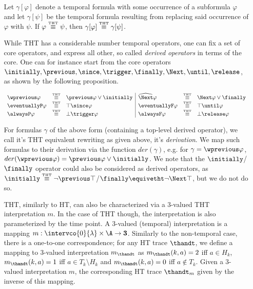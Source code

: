 \begin{proposition}
  Let $\gamma[\varphi]$ denote a temporal formula with some occurrence of a
  subformula $\varphi$ and let $\gamma[\psi]$ be the temporal formula resulting
  from replacing said occurrence of $\varphi$ with $\psi$. If
  $\varphi \stackrel{\normalfont\mbox{\tiny THT}}{\equiv} \psi$, then $\gamma[\varphi] \stackrel{\normalfont\mbox{\tiny THT}}{\equiv} \gamma[\psi]$.
\end{proposition}

While THT has a considerable number temporal operators, one can fix a
set of core operators, and express all other, so called \emph{derived
  operators} in terms of the core. One can for instance start from the
core operators
$\initially, \previous, \since, \trigger, \finally, \Next, \until,
\release$, as shown by the following proposition.

\begin{proposition}\label{prop:derived-op}
\[
\begin{array}{lll|lll}
\wprevious \varphi & \equivtht & \previous \varphi \vee \initially &
\wnext \varphi & \equivtht & \Next \varphi \vee \finally\\
\eventuallyP \varphi & \equivtht & \top \since \varphi &
\eventuallyF \varphi & \equivtht & \top \until \varphi\\
\alwaysP \varphi & \equivtht & \bot \trigger \varphi &
\alwaysF \varphi & \equivtht & \bot \release \varphi\\
\end{array}
\]
\end{proposition}

For formulas $\gamma$ of the above form (containing a top-level
derived operator), we call it's THT equivalent rewriting as given
above, it's \textit{derivation}. We map such formulas to their
derivation via the function $der(\gamma)$, e.g. for
$\gamma = \wprevious \varphi$,
$der(\wprevious \varphi) = \previous \varphi \vee \initially$. We note
that the $\initially$/$\finally$ operator could also be considered as
derived operators, as
$\initially \equivtht \lnot \previous
\top$/$\finally \equivetht \lnot \Next \top$, but we do not do so.

THT, similarly to HT, can also be characterized via a 3-valued THT
interpretation $m$. In the case of THT though, the interpretation is
also parameterized by the time point. A 3-valued (temporal)
interpretation is a mapping
$m: \intervco{0}{\lambda} \times \A \rightarrow \textbf{3}$. Similarly
to the non-temporal case, there is a one-to-one correspondence; for
any HT trace $\thandt$, we define a mapping to 3-valued interpretation
$m_{\thandt}$ as $m_{\thandt}(k,a)=2$ iff $a \in H_k$,
$m_{\thandt}(k,a)=1$ iff $a \in T_k \setminus H_k$ and
$m_{\thandt}(k,a)=0$ iff $a \not\in T_k$. Given a 3-valued
interpretation $m$, the corresponding HT trace $\thandt_m$ given by the
inverse of this mapping.

